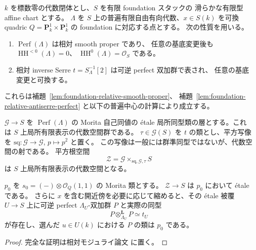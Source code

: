 \begin{proposition}
\label{prop:quadric-etale-morita-root}
$k$ を標数零の代数閉体とし、$S$ を有限 foundation スタックの
滑らかな有限型 affine chart とする。
$\Lambda$ を $S$ 上の普遍有限自由有向代数、$x\in S(k)$ を可換 quadric
$Q=\mathbf P^1_k\times\mathbf P^1_k$ の foundation に対応する点とする。
次の性質を用いる。
\begin{enumerate}
\item $\operatorname{Perf}(\Lambda)$ は相対 smooth proper であり、
  任意の基底変更後も $\operatorname{HH}^{<0}(\Lambda)=0$、
  $\operatorname{HH}^{0}(\Lambda)=\mathcal O_S$ である。
\item 相対 inverse Serre $t=S_{\Lambda}^{-1}[2]$ は可逆 perfect 双加群で表され、
  任意の基底変更と可換する。
\end{enumerate}
これらは補題~\ref{lem:foundation-relative-smooth-proper}、
補題~\ref{lem:foundation-relative-antiserre-perfect} と以下の普遍中心の計算により成立する。

$\mathcal G\to S$ を $\operatorname{Perf}(\Lambda)$ の Morita 自己同値の
\'etale 局所同型類の層とする。これは $S$ 上局所有限表示の代数空間群である。
$\tau\in\mathcal G(S)$ を $t$ の類とし、平方写像を
$\mathrm{sq}:\mathcal G\to\mathcal G$, $p\mapsto p^2$ と置く。
この写像は一般には群準同型ではないが、代数空間の射である。
平方根空間
\[
 \mathcal Z=\mathcal G\mathbin{\times}_{\mathrm{sq},\mathcal G,\tau}S
\]
は $S$ 上局所有限表示の代数空間となる。

$p_0$ を $s_0=(-)\otimes\mathcal O_Q(1,1)$ の Morita 類とする。
$\mathcal Z\to S$ は $p_0$ において \'etale である。
さらに $x$ を含む開近傍を必要に応じて縮めると、その \'etale 被覆
$U\to S$ 上に可逆 perfect $\Lambda_U$-双加群 $P$ と実際の同型
\[
 P\otimes^{\mathbf L}_{\Lambda_U}P\simeq t_U
\]
が存在し、選んだ $u\in U(k)$ における $P$ の類は $p_0$ である。
\end{proposition}

\begin{proof}
完全な証明は相対モジュライ論文 \cite[\texttt{artin_roots}]{QuadricModuli2026} に置く。
\end{proof}

